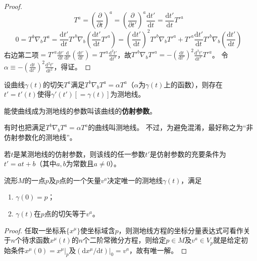 \begin{proof}
$$T^a = \left(\frac{\partial}{\partial t}\right)^a = \left(\frac{\partial}{\partial t'}\right)^a\frac{\mathrm{d}t'}{\mathrm{d}t} = \frac{\mathrm{d}t'}{\mathrm{d}t}T'^a$$
$$0 = T^b\nabla_bT^a = \frac{\mathrm{d}t'}{\mathrm{d}t}T'^b\nabla_b\left(\frac{\mathrm{d}t'}{\mathrm{d}t}T'^a\right) = \left(\frac{\mathrm{d}t'}{\mathrm{d}t}\right)^2T'^b\nabla_bT'^a + T'^a\frac{\mathrm{d}t'}{\mathrm{d}t}T'^b\nabla_b\left(\frac{\mathrm{d}t'}{\mathrm{d}t}\right)$$
右边第二项$= T'^a\frac{\mathrm{d}t'}{\mathrm{d}t}\frac{\mathrm{d}}{\mathrm{d}t'}\left(\frac{\mathrm{d}t'}{\mathrm{d}t}\right) = T'^a\frac{\mathrm{d}^2t'}{\mathrm{d}t^2}$，故$T'^b\nabla_bT'^a = -\left(\frac{\mathrm{d}t}{\mathrm{d}t'}\right)^2\frac{\mathrm{d}^2t'}{\mathrm{d}t^2}T'^a$。
令$\alpha \equiv -\left(\frac{\mathrm{d}t}{\mathrm{d}t'}\right)^2\frac{\mathrm{d}^2t'}{\mathrm{d}t^2}$，得证。
\end{proof}

\begin{theorem}
设曲线$\gamma(t)$的切矢$T^a$满足$T^b\nabla_bT^a = \alpha T^a$（$\alpha$为$\gamma(t)$上的函数），则存在$t' = t'(t)$使得$\gamma'(t')[= \gamma(t)]$为测地线。
\end{theorem}

\begin{definition}
能使曲线成为测地线的参数叫该曲线的\textbf{仿射参数}。
\end{definition}

\begin{note}
有时也把满足$T^b\nabla_bT^a = \alpha T^a$的曲线叫测地线。
不过，为避免混淆，最好称之为``非仿射参数化的测地线''。
\end{note}

\begin{theorem}
若$t$是某测地线的仿射参数，则该线的任一参数$t'$是仿射参数的充要条件为$t' = at +b$（其中$a, b$为常数且$a \neq 0$）。
\end{theorem}

\begin{theorem}
流形$M$的一点$p$及$p$点的一个矢量$v^a$决定唯一的测地线$\gamma(t)$，满足
\begin{enumerate}[（1）]
\item $\gamma(0) = p$；
\item $\gamma(t)$在$p$点的切矢等于$v^a$。
\end{enumerate}
\end{theorem}

\begin{proof}
任取一坐标系$\{x^\mu\}$使坐标域含$p$，则测地线方程的坐标分量表达式可看作关于$n$个待求函数$x^\mu(t)$的$n$个二阶常微分方程，则给定$p \in M$及$v^a \in V_p$就是给定初始条件$x^\mu(0) = x^\mu|_p$及$(\mathrm{d}x^\mu / \mathrm{d}t)|_0 = v^a$，故有唯一解。
\end{proof}

